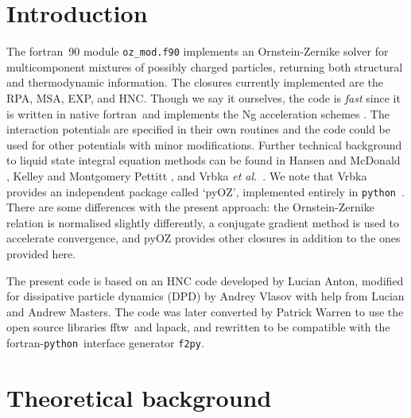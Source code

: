 \documentclass[12pt,a4paper]{article}
\newcommand{\latin}[1]{\emph{#1}}
\newcommand{\etal}{\latin{et al.}}
\newcommand{\FORTRAN}{{\sc fortran}}
\newcommand{\python}{{\tt python}}
\newcommand{\LAPACK}{{\sc lapack}}
\newcommand{\FFTW}{{\sc fftw}}
\begin{document}
\section{Introduction}
%
The \FORTRAN\ 90 module \verb+oz_mod.f90+ implements an
Ornstein-Zernike solver for multicomponent mixtures of possibly
charged particles, returning both structural and thermodynamic
information.  The closures currently implemented are the RPA, MSA,
EXP, and HNC.  Though we say it ourselves, the code is \emph{fast}
since it is written in native \FORTRAN\ and implements the Ng
acceleration schemes \cite{Ng74}.  The interaction potentials are
specified in their own routines and the code could be used for other
potentials with minor modifications.  Further technical background to
liquid state integral equation methods can be found in Hansen and
McDonald \cite{HM06}, Kelley and Montgomery Pettitt \cite{KMP04}, and
Vrbka \etal\ \cite{Vrbka09}.  We note that Vrbka provides an
independent package called `pyOZ', implemented entirely in
\python~\cite{Vrbka09}.  There are some differences with the present
approach: the Ornstein-Zernike relation is normalised slightly
differently, a conjugate gradient method is used to accelerate
convergence, and pyOZ provides other closures in addition to the ones
provided here.

The present code is based on an HNC code developed by Lucian Anton,
modified for dissipative particle dynamics (DPD) by Andrey Vlasov with
help from Lucian and Andrew Masters.  The code was later converted by
Patrick Warren to use the open source libraries \FFTW\ and \LAPACK,
and rewritten to be compatible with the \FORTRAN-\python\ interface
generator \verb+f2py+.

\section{Theoretical background}
%
\end{document}
